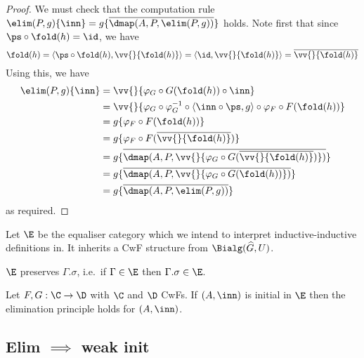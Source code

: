 \documentclass{article}
\begin{document}
\begin{proof}
We must check that the computation rule $\elim(P, g)\{\inn\} =
g\{\overline{\dmap(A, P, \elim(P, g))}\}$ holds. Note first that since
$\ps \circ \fold(h) = \id$, we have
\[
\fold(h) = \langle \ps \circ \fold(h), \vv{}\{\fold(h)\}\rangle
         = \langle \id , \vv{}\{\fold(h)\}\rangle
         = \overline{\vv{}\{\fold(h)\}}
\]
Using this, we have
\begin{align*}
  \elim(P, g)\{\inn\} &=  \vv{}\{\varphi_G \circ G(\fold(h)) \circ \inn\} \\
                      &=  \vv{}\{\varphi_G \circ \varphi_G^{-1} \circ \langle \inn \circ \ps, g\rangle \circ \varphi_F \circ F(\fold(h))\} \\
                      &=  g\{\varphi_F \circ F(\fold(h))\} \\
                      &=  g\{\varphi_F \circ F(\overline{\vv{}\{\fold(h)\}})\} \\
                      &=  g\{\overline{\dmap(A, P, \vv{}\{\varphi_G \circ G(\overline{\vv{}\{\fold(h)\}})\})}\} \\
                      &=  g\{\overline{\dmap(A, P, \vv{}\{\varphi_G \circ G(\fold(h))\})}\} \\
                      &=  g\{\overline{\dmap(A, P, \elim(P, g))}\}
\end{align*}
as required.
\end{proof}

Let $\E$ be the equaliser category which we intend to interpret
inductive-inductive definitions in. It inherits a CwF structure from
$\Bialg(\widehat{G}, U)$.

\begin{lemma}
  $\E$ preserves $\Gamma.\sigma$, i.e.\ if $\Gamma \in \E$ then $\Gamma.\sigma \in \E$.
\end{lemma}

\begin{corollary}
    Let $F, G : \C \to \D$ with $\C$ and $\D$ CwFs. If $(A, \inn)$ is
  initial in $\E$ then the elimination principle holds for
  $(A, \inn)$.
\end{corollary}

\subsection{Elim $\implies$ weak init}




\end{document}
